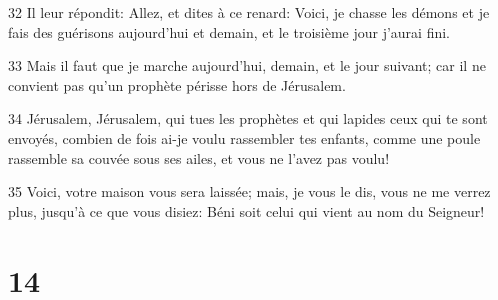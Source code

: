\par 32 Il leur répondit: Allez, et dites à ce renard: Voici, je chasse les démons et je fais des guérisons aujourd'hui et demain, et le troisième jour j'aurai fini.
\par 33 Mais il faut que je marche aujourd'hui, demain, et le jour suivant; car il ne convient pas qu'un prophète périsse hors de Jérusalem.
\par 34 Jérusalem, Jérusalem, qui tues les prophètes et qui lapides ceux qui te sont envoyés, combien de fois ai-je voulu rassembler tes enfants, comme une poule rassemble sa couvée sous ses ailes, et vous ne l'avez pas voulu!
\par 35 Voici, votre maison vous sera laissée; mais, je vous le dis, vous ne me verrez plus, jusqu'à ce que vous disiez: Béni soit celui qui vient au nom du Seigneur!

\chapter{14}

